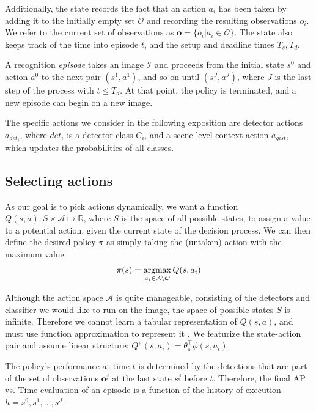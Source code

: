 Additionally, the state records the fact that an action $a_i$ has been taken by adding it to the initially empty set $\mathcal{O}$ and recording the resulting observations $o_i$.
We refer to the current set of observations as $\mathbf{o} = \{o_i | a_i \in \mathcal{O}\}$.
The state also keeps track of the time into episode $t$, and the setup and deadline times $T_s,T_d$.

A recognition \emph{episode} takes an image $\mathcal{I}$ and proceeds from the initial state $s^0$ and action $a^0$ to the next pair $(s^1,a^1)$, and so on until $(s^J,a^J)$, where $J$ is the last step of the process with $t \le T_d$.
At that point, the policy is terminated, and a new episode can begin on a new image.

The specific actions we consider in the following exposition are detector actions $a_{{det}_i}$, where ${det}_i$ is a detector class $C_i$, and a scene-level context action $a_{gist}$, which updates the probabilities of all classes.

\subsection{Selecting actions} \label{sec:value}
As our goal is to pick actions dynamically, we want a function $Q(s,a): S \times \mathcal{A} \mapsto \mathbb{R}$, where $S$ is the space of all possible states, to assign a value to a potential action, given the current state of the decision process.
We can then define the desired policy $\pi$ as simply taking the (untaken) action with the maximum value:
\begin{align}
\pi(s) = \argmax_{a_i \in \mathcal{A} \setminus \mathcal{O}} Q(s,a_i)
\end{align}

Although the action space $\mathcal{A}$ is quite manageable, consisting of the detectors and classifier we would like to run on the image, the space of possible states $S$ is infinite.
Therefore we cannot learn a tabular representation of $Q(s,a)$, and must use function approximation to represent it \cite{Sutton1998}.
We featurize the state-action pair and assume linear structure: $Q^\pi(s,a_i) = \theta_\pi^\top  \phi(s,a_i)$.

The policy's performance at time $t$ is determined by the detections that are part of the set of observations $\mathbf{o}^j$ at the last state $s^j$ before $t$.
Therefore, the final AP vs. Time evaluation of an episode is a function of the history of execution $h=s^0,s^1,\dots,s^J$.

